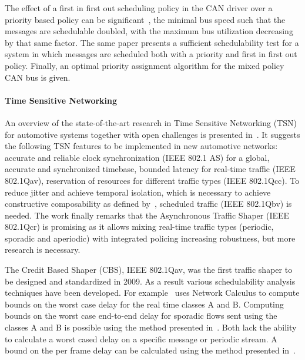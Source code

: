 The effect of a first in first out scheduling policy in the CAN driver over a priority based policy can be significant~\cite{davis2011controller}, the minimal bus speed such that the messages are schedulable doubled, with the maximum bus utilization decreasing by that same factor. The same paper presents a sufficient schedulability test for a system in which messages are scheduled both with a priority and first in first out policy. Finally, an optimal priority assignment algorithm for the mixed policy CAN bus is given.

\paragraph{Time Sensitive Networking}
An overview of the state-of-the-art research in Time Sensitive Networking (TSN) for automotive systems together with open challenges is presented in~\cite{ashjaei2021time}. It suggests the following TSN features to be implemented in new automotive networks: accurate and reliable clock synchronization (IEEE 802.1 AS) for a global, accurate and synchronized timebase, bounded latency for real-time traffic (IEEE 802.1Qav), reservation of resources for different traffic types (IEEE 802.1Qcc). To reduce jitter and achieve temporal isolation, which is necessary to achieve constructive composability as defined by~\cite{kopetz2003time}, scheduled traffic (IEEE 802.1Qbv) is needed. The work finally remarks that the Asynchronous Traffic Shaper (IEEE 802.1Qcr) is promising as it allows mixing real-time traffic types (periodic, sporadic and aperiodic) with integrated policing increasing robustness, but more research is necessary.

The Credit Based Shaper (CBS), IEEE 802.1Qav, was the first traffic shaper to be designed and standardized in 2009. As a result various schedulability analysis techniques have been developed. For example~\cite{de2014complete} uses Network Calculus to compute bounds on the worst case delay for the real time classes A and B. Computing bounds on the worst case end-to-end delay for sporadic flows sent using the classes A and B is possible using the method presented in~\cite{li2017deterministic}. Both lack the ability to calculate a worst cased delay on a specific message or periodic stream. A bound on the per frame delay can be calculated using the method presented in~\cite{cao2016independent}. 

